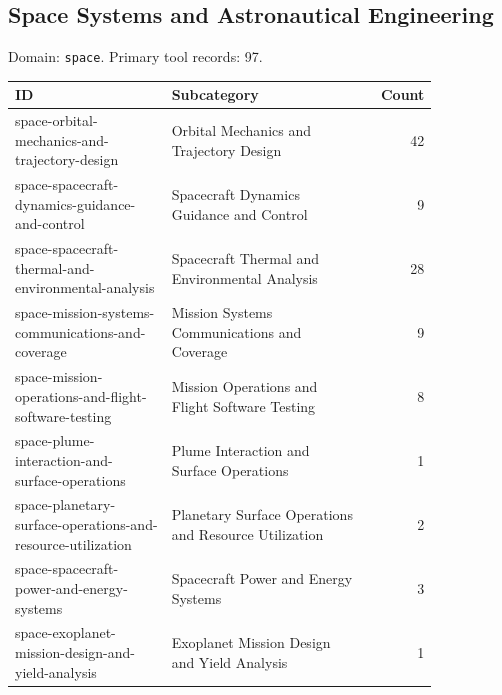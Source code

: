 \subsection{Space Systems and Astronautical Engineering}
\noindent Domain: \texttt{space}. Primary tool records: 97.
\begin{longtable}{p{0.37\linewidth}p{0.47\linewidth}r}
ID & Subcategory & Count\\\hline\endhead
space-orbital-mechanics-and-trajectory-design & Orbital Mechanics and Trajectory Design & 42\\
space-spacecraft-dynamics-guidance-and-control & Spacecraft Dynamics Guidance and Control & 9\\
space-spacecraft-thermal-and-environmental-analysis & Spacecraft Thermal and Environmental Analysis & 28\\
space-mission-systems-communications-and-coverage & Mission Systems Communications and Coverage & 9\\
space-mission-operations-and-flight-software-testing & Mission Operations and Flight Software Testing & 8\\
space-plume-interaction-and-surface-operations & Plume Interaction and Surface Operations & 1\\
space-planetary-surface-operations-and-resource-utilization & Planetary Surface Operations and Resource Utilization & 2\\
space-spacecraft-power-and-energy-systems & Spacecraft Power and Energy Systems & 3\\
space-exoplanet-mission-design-and-yield-analysis & Exoplanet Mission Design and Yield Analysis & 1\\
\end{longtable}
